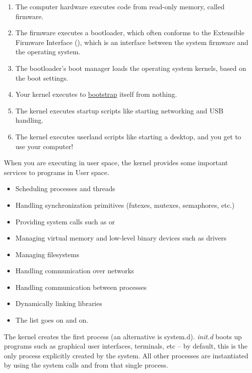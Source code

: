 \begin{enumerate}
\item The computer hardware executes code from read-only memory, called firmware.
\item The firmware executes a bootloader, which often conforms to the Extensible Firmware Interface (), which is an interface between the system firmware and the operating system.
\item The bootloader's boot manager loads the operating system kernels, based on the boot settings.
\item
  Your kernel executes  to \href{https://en.wikipedia.org/wiki/Bootstrapping}{bootstrap} itself from nothing.
\item The kernel executes startup scripts like starting networking and USB handling.
\item The kernel executes userland scripts like starting a desktop, and you get to use your computer!
\end{enumerate}

When you are executing in user space, the kernel provides some important services to programs in User space.

\begin{itemize}
\item Scheduling processes and threads
\item Handling synchronization primitives (futexes, mutexes, semaphores, etc.)
\item Providing system calls such as  or 
\item Managing virtual memory and low-level binary devices such as  drivers
\item Managing filesystems
\item Handling communication over networks
\item Handling communication between processes
\item Dynamically linking libraries
\item The list goes on and on.
\end{itemize}

The kernel creates the first process  (an alternative is system.d).
\emph{init.d} boots up programs such as graphical user interfaces, terminals, etc -- by default, this is the only process explicitly created by the system.
All other processes are instantiated by using the system calls  and  from that single process.

